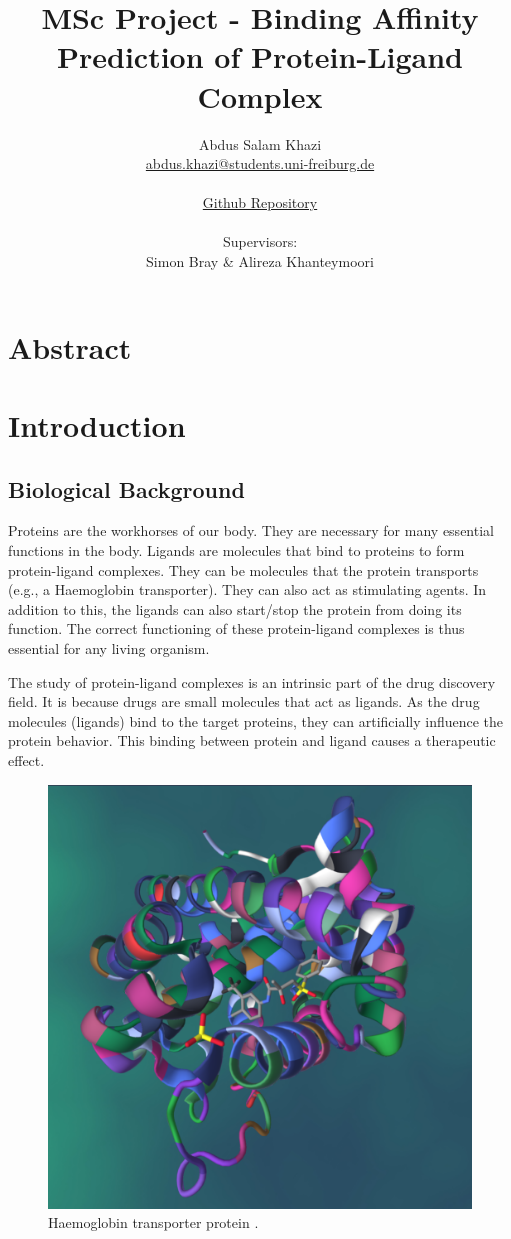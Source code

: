 \documentclass[11pt]{article}
\title{MSc Project - Binding Affinity Prediction of Protein-Ligand Complex}
\author{
        Abdus Salam Khazi\\
        \href{mailto:abdus.khazi@students.uni-freiburg.de}
                {abdus.khazi@students.uni-freiburg.de}\\ \\
        \href{https://github.com/abduskhazi/MSc-Project}
                {Github Repository} \cite{github_repository} \\ \\
        Supervisors:
        \begin{tabular}{ll}
			Simon Bray \&
			Alireza Khanteymoori
		\end{tabular}
       }
\begin{document}
\maketitle
\date{}
\tableofcontents
\newpage

\section{Abstract}
\newpage

\section{Introduction}

\subsection{Biological Background}
Proteins are the workhorses of our body.  They are necessary for many essential functions in the body.  Ligands are molecules that bind to proteins to form protein-ligand complexes.  They can be molecules that the protein transports (e.g., a Haemoglobin transporter). They can also act as stimulating agents.  In addition to this, the ligands can also start/stop the protein from doing its function. The correct functioning of these protein-ligand complexes is thus essential for any living organism.

The study of protein-ligand complexes is an intrinsic part of the drug discovery field. It is because drugs are small molecules that act as ligands. As the drug molecules (ligands) bind to the target proteins, they can artificially influence the protein behavior. This binding between protein and ligand causes a therapeutic effect.

\begin{figure}[htb]
  \centering
    \includegraphics[scale=0.15]{images/pl_complex}
    \caption{Haemoglobin transporter protein \cite{PL_complex_introduction}.}
    \label{fig:HaemoglobinTransporterImage}
\end{figure}
\end{document}

